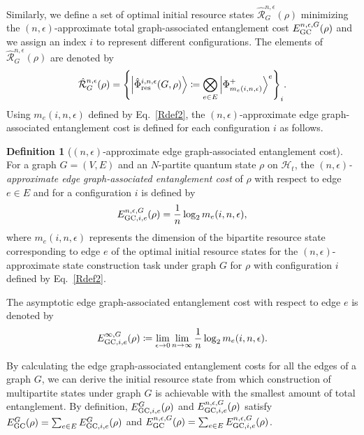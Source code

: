 \documentclass[preprintnumbers,aps,amsmath,amssymb,pra,twocolumn,showpacs,superscriptaddress,floatfix]{revtex4-1}
\def\Ket#1{\left|#1\right\rangle}
\theoremstyle{plain}
\theoremstyle{definition}
\newtheorem{definition}[theorem]{Definition}
\theoremstyle{remark}
\begin{document}
Similarly, we define a set of optimal initial resource states $\hat{\mathcal{R}}_G^{n, \epsilon} (\rho)$ minimizing the $(n,\epsilon)$-approximate total graph-associated entanglement cost $E_{\textup{GC}}^{n, \epsilon, G} (\rho)$ and we assign an index $i$ to represent different configurations.  The elements of $\hat{\mathcal{R}}_G^{n, \epsilon} (\rho) $ are denoted by 
\begin{align}
    \hat{\mathcal{R}}_G^{n, \epsilon} (\rho) = {\left\{ \Ket{\hat{\Phi}_{\textup{res}}^{i,n,\epsilon} (G,\rho) } \coloneqq \bigotimes_{e \in E} \Ket{\Phi_{m_e(i,n,\epsilon)}^+}^e\right\}}_i.  
\label{Rdef2}
\end{align}
Using $m_e(i,n,\epsilon)$ defined by Eq.~\eqref{Rdef2}, the $(n,\epsilon)$-approximate edge graph-associated entanglement cost is defined for each configuration $i$ as follows.
\begin{definition}[$(n,\epsilon)$-approximate edge graph-associated entanglement cost]
    For a graph $G=(V,E)$ and an $N$-partite quantum state $\rho$ on $\mathcal{H}_t$, the \textit{$(n,\epsilon)$-approximate edge graph-associated entanglement cost} of $\rho$ with respect to edge $e\in E$ and for a configuration $i$  is defined by 
\begin{align*}
E_{\textup{GC},i,e}^{n,\epsilon, G} (\rho) = \frac{1}{n} \log_2 m_e (i,n,\epsilon),
\end{align*}
where $m_e (i,n,\epsilon)$ represents the dimension of the bipartite resource state corresponding to edge $e$ of the optimal initial resource states for the $(n,\epsilon)$-approximate state construction task under graph $G$ for $\rho$ with configuration $i$ defined by Eq.~\eqref{Rdef2}.
\end{definition}

The asymptotic edge graph-associated entanglement cost with respect to edge $e$ is denoted by
\begin{align*}
E_{\textup{GC},i,e}^{\infty, G} (\rho) \coloneqq  
\lim_{\epsilon \rightarrow 0} \lim_{n \rightarrow \infty} \frac{1}{n} \log_2 m_e (i,n,\epsilon).
\end{align*}

By calculating the edge graph-associated entanglement costs for all the edges of a graph $G$,
we can derive the initial resource state from which construction of multipartite states under graph $G$ is achievable with the smallest amount of total entanglement.
By definition, $E_{\textup{GC},i,e}^G (\rho)$ and $E_{\textup{GC},i,e}^{n,\epsilon, G} (\rho)$ satisfy $E_{\textup{GC}}^G (\rho)=\sum_{e \in E} E_{\textup{GC},i,e}^G (\rho)$ and $E_{\textup{GC}}^{n,\epsilon, G} (\rho)  = \sum_{e \in E} E_{\textup{GC},i,e}^{n,\epsilon, G} (\rho)$.
\end{document}
